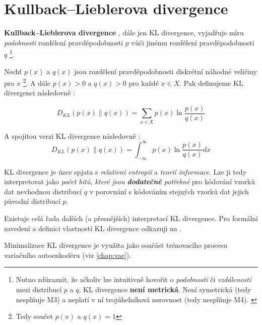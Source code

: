 \section{Kullback–Lieblerova divergence}
\label{sec:kl_divergence}

\textbf{Kullback–Lieblerova divergence} \cite{Kullback1951}, dále jen KL divergence, vyjadřuje míru \emph{podobnosti} rozdělení pravděpodobnosti $p$ vůči jinému rozdělení pravděpodobnosti $q$
\footnote{Nutno zdůraznit, že ačkoliv lze intuitivně hovořit o \emph{podobnosti} či \emph{vzdálenosti} mezi distribucí $p$ a $q$, KL divergence \textbf{není metrická}. Není symetrická (tedy nesplňuje M3) a neplatí v ní trojúhelníková nerovnost (tedy nesplňuje M4). \cite{Phillips2021}}.


Nechť $p(x)$ a $q(x)$ jsou rozdělení pravděpodobnosti diskrétní náhodné veličiny pro $x$
\footnote{Tedy součet $p(x)$ a $q(x) = 1$}.
A dále $p(x) > 0$ a $q(x) > 0$ pro každé $x \in X$. Pak definujeme KL divergenci následovně \cite{Murphy2022}:

\begin{equation}
    D_{KL}(p(x) \| q(x)) = \sum_{x \in X}^{}p(x)\ln{\frac{p(x)}{q(x)}}
\end{equation}

A spojitou verzi KL divergence následovně \cite{Murphy2022}:
\begin{equation}
    D_{KL}(p(x) \| q(x)) = \int_{-\infty}^{\infty}p(x)\ln{\frac{p(x)}{q(x)}}dx 
\end{equation}

KL divergence je úzce spjata s \emph{relativní entropií} a \emph{teorií informace}.
Lze ji tedy interpretovat jako \emph{počet bitů, které jsou \textbf{dodatečně} potřebné} pro kódování vzorků dat nevhodnou distribucí $q$ v porovnání s kódováním stejných vzorků dat jejich původní distribucí $p$.

Existuje celá řada dalších (a přesnějších) interpretací KL divergence. Pro formální zavedení a definici vlastností KL divergence odkazuji na \cite[kap. 5.1]{Murphy2023}.

Minimalizace KL divergence je využita jako součást trénovacího procesu variačního autoenkodéru (viz \autoref{chap:vae}).
